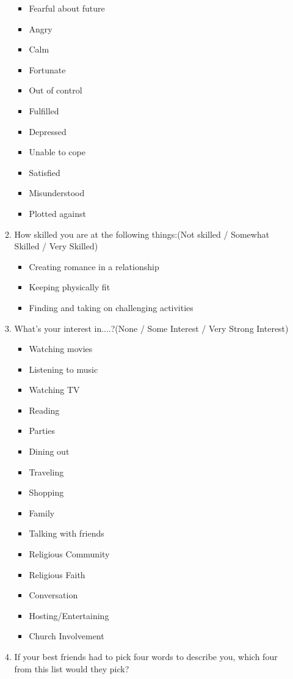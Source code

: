 \begin{appendices}
\begin{itemize}
\begin{enumerate}
\begin{itemize}
				\item Fearful about future
				\item Angry
				\item Calm
				\item Fortunate
				\item Out of control
				\item Fulfilled
				\item Depressed
				\item Unable to cope
				\item Satisfied
				\item Misunderstood
				\item Plotted against			
			\end{itemize}
			\item How skilled you are at the following things:(Not skilled / Somewhat Skilled / Very Skilled)
			\begin{itemize}
				\item Creating romance in a relationship
				\item Keeping physically fit
				\item Finding and taking on challenging activities
			\end{itemize}
			\item What's your interest in....?(None / Some Interest / Very Strong Interest)
			\begin{itemize}
				\item Watching movies
				\item Listening to music
				\item Watching TV
				\item Reading
				\item Parties
				\item Dining out
				\item Traveling
				\item Shopping
				\item Family
				\item Talking with friends
				\item Religious Community
				\item Religious Faith
				\item Conversation
				\item Hosting/Entertaining
				\item Church Involvement
			\end{itemize}
			\item If your best friends had to pick four words to describe you, which four from this list would they pick?

\end{enumerate}
\end{itemize}
\end{appendices}
